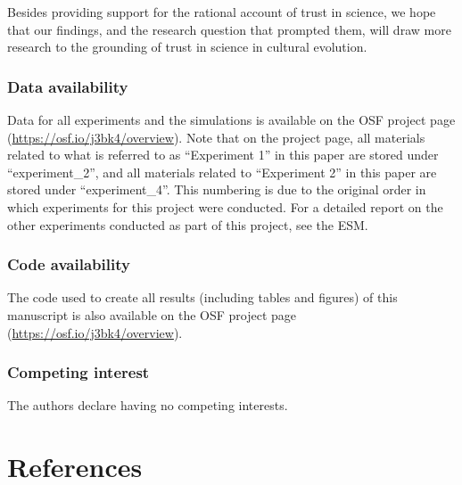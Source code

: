 \documentclass[
  english,
  doc,floatsintext]{apa6}
\begin{document}
Besides providing support for the rational account of trust in science, we hope that our findings, and the research question that prompted them, will draw more research to the grounding of trust in science in cultural evolution.

\subsubsection{Data availability}\label{data-availability}

Data for all experiments and the simulations is available on the OSF project page (\url{https://osf.io/j3bk4/overview}). Note that on the project page, all materials related to what is referred to as ``Experiment 1'' in this paper are stored under ``experiment\_2'', and all materials related to ``Experiment 2'' in this paper are stored under ``experiment\_4''. This numbering is due to the original order in which experiments for this project were conducted. For a detailed report on the other experiments conducted as part of this project, see the ESM.

\subsubsection{Code availability}\label{code-availability}

The code used to create all results (including tables and figures) of this manuscript is also available on the OSF project page (\url{https://osf.io/j3bk4/overview}).

\subsubsection{Competing interest}\label{competing-interest}

The authors declare having no competing interests.

\FloatBarrier

\section{References}\label{references}
\end{document}
